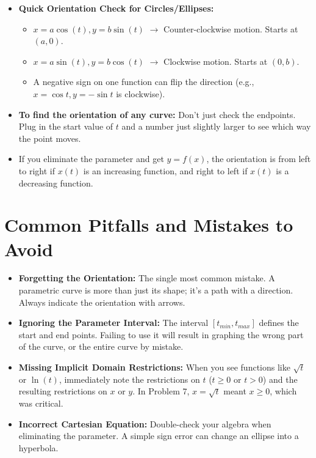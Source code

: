 \documentclass{article}
\begin{document}
\begin{itemize}
    \item \textbf{Quick Orientation Check for Circles/Ellipses:}
        \begin{itemize}
            \item $x = a \cos(t), y = b \sin(t)$ $\rightarrow$ Counter-clockwise motion. Starts at $(a, 0)$.
            \item $x = a \sin(t), y = b \cos(t)$ $\rightarrow$ Clockwise motion. Starts at $(0, b)$.
            \item A negative sign on one function can flip the direction (e.g., $x=\cos t, y=-\sin t$ is clockwise).
        \end{itemize}
    \item \textbf{To find the orientation of any curve:} Don't just check the endpoints. Plug in the start value of $t$ and a number just slightly larger to see which way the point moves.
    \item If you eliminate the parameter and get $y=f(x)$, the orientation is from left to right if $x(t)$ is an increasing function, and right to left if $x(t)$ is a decreasing function.
\end{itemize}

\section{Common Pitfalls and Mistakes to Avoid}

\begin{itemize}
    \item \textbf{Forgetting the Orientation:} The single most common mistake. A parametric curve is more than just its shape; it's a path with a direction. Always indicate the orientation with arrows.
    \item \textbf{Ignoring the Parameter Interval:} The interval $[t_{min}, t_{max}]$ defines the start and end points. Failing to use it will result in graphing the wrong part of the curve, or the entire curve by mistake.
    \item \textbf{Missing Implicit Domain Restrictions:} When you see functions like $\sqrt{t}$ or $\ln(t)$, immediately note the restrictions on $t$ ($t \ge 0$ or $t > 0$) and the resulting restrictions on $x$ or $y$. In Problem 7, $x=\sqrt{t}$ meant $x \ge 0$, which was critical.
    \item \textbf{Incorrect Cartesian Equation:} Double-check your algebra when eliminating the parameter. A simple sign error can change an ellipse into a hyperbola.
\end{itemize}
\end{document}
